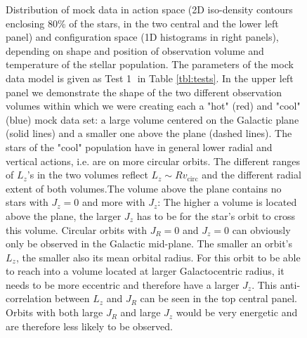 \begin{figure}[H]
\caption{Distribution of mock data in action space (2D iso-density contours enclosing 80\% of the stars, in the two central and the lower left panel) and configuration space (1D histograms in right panels), depending on shape and position of observation volume and temperature of the stellar population. The parameters of the mock data model is given as Test \textcircled{1} in Table \ref{tbl:tests}. In the upper left panel we demonstrate the shape of the two different observation volumes within which we were creating each a "hot" (red) and "cool" (blue) mock data set: a large volume centered on the Galactic plane (solid lines) and a smaller one above the plane (dashed lines). The stars of the "cool" population have in general lower radial and vertical actions, i.e. are on more circular orbits. The different ranges of $L_z$'s in the two volumes reflect $L_z \sim R  v_\text{circ}$ and the different radial extent of both volumes.The volume above the plane contains no stars with $J_z = 0$ and more with $J_z$: The higher a volume is located above the plane, the larger $J_z$ has to be for the star's orbit to cross this volume. Circular orbits with $J_R = 0$ and $J_z = 0$ can obviously only be observed in the Galactic mid-plane. The smaller an orbit's $L_z$, the smaller also its mean orbital radius. For this orbit to be able to reach into a volume located at larger Galactocentric radius, it needs to be more eccentric and therefore have a larger $J_z$. This anti-correlation between $L_z$ and $J_R$ can be seen in the top central panel. Orbits with both large $J_R$ and large $J_z$ would be very energetic and are therefore less likely to be observed.} 
\label{fig:mockdatadistr}
\end{figure}
%
